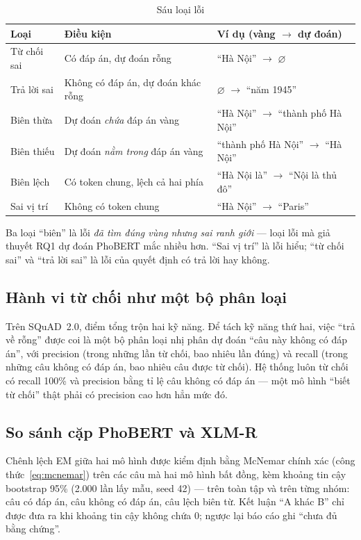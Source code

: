 \begin{table}[htbp]
\centering
\caption{Sáu loại lỗi}
\label{tab:taxonomy-def}
\renewcommand{\arraystretch}{1.15}
\small
\begin{tabularx}{\textwidth}{@{}l L L@{}}
\toprule
\textbf{Loại} & \textbf{Điều kiện} & \textbf{Ví dụ (vàng $\to$ dự đoán)} \\
\midrule
Từ chối sai & Có đáp án, dự đoán rỗng & ``Hà Nội'' $\to$ $\varnothing$ \\
Trả lời sai & Không có đáp án, dự đoán khác rỗng & $\varnothing$ $\to$ ``năm 1945'' \\
Biên thừa & Dự đoán \emph{chứa} đáp án vàng & ``Hà Nội'' $\to$ ``thành phố Hà Nội'' \\
Biên thiếu & Dự đoán \emph{nằm trong} đáp án vàng & ``thành phố Hà Nội'' $\to$ ``Hà Nội'' \\
Biên lệch & Có token chung, lệch cả hai phía & ``Hà Nội là'' $\to$ ``Nội là thủ đô'' \\
Sai vị trí & Không có token chung & ``Hà Nội'' $\to$ ``Paris'' \\
\bottomrule
\end{tabularx}
\end{table}

Ba loại ``biên'' là lỗi \emph{đã tìm đúng vùng nhưng sai ranh giới} --- loại lỗi mà giả thuyết RQ1
dự đoán PhoBERT mắc nhiều hơn. ``Sai vị trí'' là lỗi hiểu; ``từ chối sai'' và ``trả lời sai'' là lỗi
của quyết định có trả lời hay không.

\subsection{Hành vi từ chối như một bộ phân loại}
\label{sec:abstention}

Trên SQuAD~2.0, điểm tổng trộn hai kỹ năng. Để tách kỹ năng thứ hai, việc ``trả về rỗng'' được
coi là một bộ phân loại nhị phân dự đoán ``câu này không có đáp án'', với precision (trong những
lần từ chối, bao nhiêu lần đúng) và recall (trong những câu không có đáp án, bao nhiêu câu được
từ chối). Hệ thống luôn từ chối có recall 100\% và precision bằng tỉ lệ câu không có đáp án ---
một mô hình ``biết từ chối'' thật phải có precision cao hơn hẳn mức đó.

\subsection{So sánh cặp PhoBERT và XLM-R}
\label{sec:paired}

Chênh lệch EM giữa hai mô hình được kiểm định bằng McNemar chính xác (công thức~\ref{eq:mcnemar})
trên các câu mà hai mô hình bất đồng, kèm khoảng tin cậy bootstrap 95\% (2.000 lần lấy mẫu, seed
42) --- trên toàn tập và trên từng nhóm: câu có đáp án, câu không có đáp án, câu lệch biên từ.
Kết luận ``A khác B'' chỉ được đưa ra khi khoảng tin cậy không chứa 0; ngược lại báo cáo ghi
``chưa đủ bằng chứng''.

